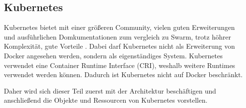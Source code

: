 \subsection{Kubernetes}

Kubernetes bietet mit einer größeren Community, vielen guten Erweiterungen und ausführlichen Domkumentationen
zum vergleich zu Swarm, trotz höhrer Komplexität, gute Vorteile \parencite[vgl. 452]{kofler2023docker}.
Dabei darf Kubernetes nicht als Erweiterung von Docker angesehen werden, sondern als eigenständiges System.
Kubernetes verwendet eine Container Runtime Interface (CRI), weshalb weitere Runtimes verwendet werden können. Dadurch ist Kubernetes nicht auf Docker beschränkt.

Daher wird sich dieser Teil zuerst mit der Architektur beschäftigen und anschließend die Objekte und Ressourcen von Kubernetes vorstellen.






